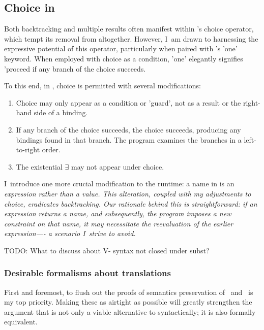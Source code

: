 \documentclass[manuscript,screen,review, 12pt, nonacm]{acmart}
\begin{document}
    \subsection{Choice in \VMinus}
    Both backtracking and multiple results often manifest within \VC's choice
    operator, which tempt its removal from \VMinus altogether. However, I~am drawn
    to harnessing the expressive potential of this operator, particularly when
    paired with \VC's 'one' keyword. When employed with choice as a condition, 'one'
    elegantly signifies 'proceed if any branch of the choice succeeds. 
    
    To this end, in \VMinus, choice is permitted with several modifications:
    
        \begin{enumerate}
        \item Choice may only appear as a condition or 'guard', not as a result
        or the right-hand side of a binding.
        \item If any branch of the choice succeeds, the choice succeeds,
        producing any bindings found in that branch. The program examines the
        branches in a left-to-right order.
        \item The existential $\exists$ may not appear under choice.
        \end{enumerate}
        
        I~introduce one more crucial modification to the \VC runtime: a name in
        \VMinus is an \it{expression} rather than a \it{value}. This alteration,
        coupled with my adjustments to choice, eradicates backtracking. Our
        rationale behind this is straightforward: if an expression returns a
        name, and subsequently, the program imposes a new constraint on that
        name, it may necessitate the reevaluation of the earlier expression—- a
        scenario I~strive to avoid. 

        TODO: What to discuss about V- syntax not closed under subst? 

        \subsubsection{Desirable formalisms about translations}
        First and foremost, to flush out the proofs of semantics preservation of
        \PTran\ and \DTran\ is my top priority. Making these as airtight as
        possible will greatly strengthen the argument that \VMinus is not only a
        viable alternative to \PPlus syntactically; it is also formally
        equivalent. 
\end{document}
